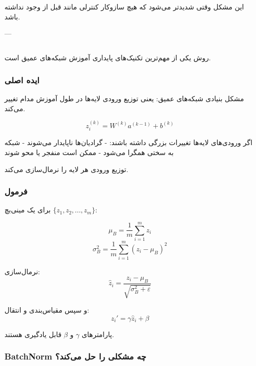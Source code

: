\documentclass{article}
\begin{document}
این مشکل وقتی شدیدتر می‌شود که هیچ سازوکار کنترلی مانند  قبل از  وجود نداشته باشد.


---

\subsection{}

روش  یکی از مهم‌ترین تکنیک‌های پایداری آموزش شبکه‌های عمیق است.

\subsubsection*{ایده اصلی }

مشکل بنیادی شبکه‌های عمیق:  
\textbf{}  
یعنی توزیع ورودی لایه‌ها در طول آموزش مدام تغییر می‌کند.

\[
z_i^{(k)} = W^{(k)} a^{(k-1)} + b^{(k)}
\]

اگر ورودی‌های لایه‌ها تغییرات بزرگی داشته باشند:
- گرادیان‌ها ناپایدار می‌شوند  
- شبکه به سختی همگرا می‌شود  
- ممکن است منفجر یا محو شوند  

\textbf{} توزیع ورودی هر لایه را نرمال‌سازی می‌کند.

\subsubsection*{فرمول }

برای یک مینی‌بچ $\{z_1, z_2, ..., z_m\}$:

\[
\mu_B = \frac{1}{m}\sum_{i=1}^{m} z_i
\]
\[
\sigma^2_B = \frac{1}{m} \sum_{i=1}^{m} (z_i - \mu_B)^2
\]

نرمال‌سازی:
\[
\hat{z}_i = \frac{z_i - \mu_B}{\sqrt{\sigma_B^2 + \varepsilon}}
\]

و سپس مقیاس‌بندی و انتقال:
\[
z_i' = \gamma \hat{z}_i + \beta
\]

پارامترهای $\gamma$ و $\beta$ قابل یادگیری هستند.

\subsubsection*{BatchNorm چه مشکلی را حل می‌کند؟}
\end{document}
